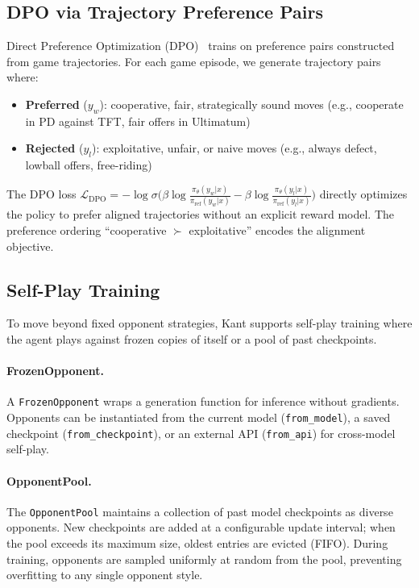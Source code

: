 \subsection{DPO via Trajectory Preference Pairs}
\label{sec:dpo}

Direct Preference Optimization (DPO)~\citep{rafailov2023direct} trains on
preference pairs constructed from game trajectories. For each game episode,
we generate trajectory pairs where:

\begin{itemize}[nosep]
    \item \textbf{Preferred} ($y_w$): cooperative, fair, strategically sound
          moves (e.g., cooperate in PD against TFT, fair offers in Ultimatum)
    \item \textbf{Rejected} ($y_l$): exploitative, unfair, or naive moves
          (e.g., always defect, lowball offers, free-riding)
\end{itemize}

\noindent The DPO loss $\mathcal{L}_{\text{DPO}} = -\log\sigma\bigl(
\beta \log \frac{\pi_\theta(y_w|x)}{\pi_{\text{ref}}(y_w|x)} -
\beta \log \frac{\pi_\theta(y_l|x)}{\pi_{\text{ref}}(y_l|x)}\bigr)$
directly optimizes the policy to prefer aligned trajectories without an
explicit reward model. The preference ordering
``cooperative $\succ$ exploitative'' encodes the alignment objective.

\subsection{Self-Play Training}
\label{sec:self-play}

To move beyond fixed opponent strategies, Kant supports self-play training
where the agent plays against frozen copies of itself or a pool of past
checkpoints.

\paragraph{FrozenOpponent.}
A \texttt{FrozenOpponent} wraps a generation function for inference without
gradients. Opponents can be instantiated from the current model
(\texttt{from\_model}), a saved checkpoint (\texttt{from\_checkpoint}), or
an external API (\texttt{from\_api}) for cross-model self-play.

\paragraph{OpponentPool.}
The \texttt{OpponentPool} maintains a collection of past model checkpoints
as diverse opponents. New checkpoints are added at a configurable update
interval; when the pool exceeds its maximum size, oldest entries are evicted
(FIFO). During training, opponents are sampled uniformly at random from the
pool, preventing overfitting to any single opponent style.

